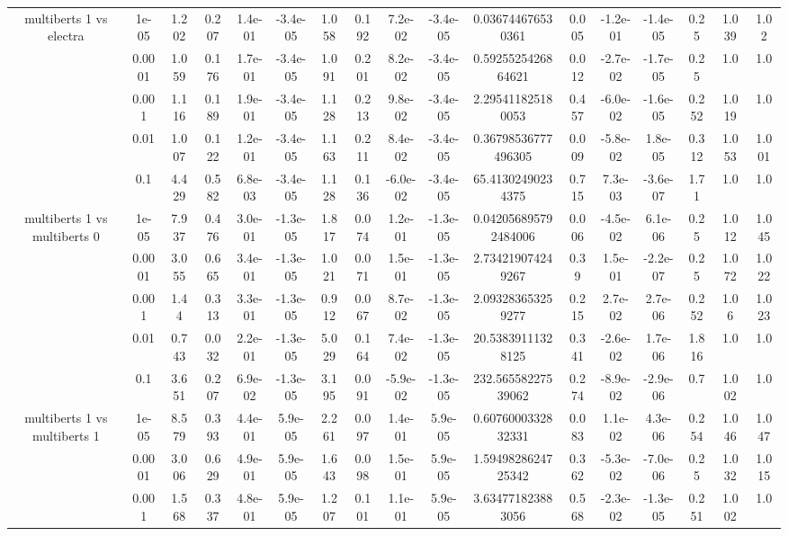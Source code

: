 \begin{tabular}{|c|c|c|c|c|c|c|c|c|c|c|c|c|c|c|c|c|}
\hline
\multirow{5}{*}{multiberts 1 vs electra } & 1e-05 & 1.202 & 0.207 & 1.4e-01 & -3.4e-05 & 1.058 & 0.192 & 7.2e-02 & -3.4e-05 & 0.036744676530361 & 0.005 & -1.2e-01 & -1.4e-05 & 0.25 & 1.039 & 1.02 \\
 & 0.0001 & 1.059 & 0.176 & 1.7e-01 & -3.4e-05 & 1.091 & 0.201 & 8.2e-02 & -3.4e-05 & 0.5925525426864621 & 0.012 & -2.7e-02 & -1.7e-05 & 0.25 & 1.0 & 1.0 \\
 & 0.001 & 1.116 & 0.189 & 1.9e-01 & -3.4e-05 & 1.128 & 0.213 & 9.8e-02 & -3.4e-05 & 2.295411825180053 & 0.457 & -6.0e-02 & -1.6e-05 & 0.252 & 1.019 & 1.0 \\
 & 0.01 & 1.007 & 0.122 & 1.2e-01 & -3.4e-05 & 1.163 & 0.211 & 8.4e-02 & -3.4e-05 & 0.36798536777496305 & 0.009 & -5.8e-02 & 1.8e-05 & 0.312 & 1.053 & 1.001 \\
 & 0.1 & 4.429 & 0.582 & 6.8e-03 & -3.4e-05 & 1.128 & 0.136 & -6.0e-02 & -3.4e-05 & 65.41302490234375 & 0.715 & 7.3e-03 & -3.6e-07 & 1.71 & 1.0 & 1.0 \\
\hline
\multirow{5}{*}{multiberts 1 vs multiberts 0} & 1e-05 & 7.937 & 0.476 & 3.0e-01 & -1.3e-05 & 1.817 & 0.074 & 1.2e-01 & -1.3e-05 & 0.042056895792484006 & 0.006 & -4.5e-02 & 6.1e-06 & 0.25 & 1.012 & 1.045 \\
 & 0.0001 & 3.055 & 0.665 & 3.4e-01 & -1.3e-05 & 1.021 & 0.071 & 1.5e-01 & -1.3e-05 & 2.734219074249267 & 0.39 & 1.5e-01 & -2.2e-07 & 0.25 & 1.072 & 1.022 \\
 & 0.001 & 1.44 & 0.313 & 3.3e-01 & -1.3e-05 & 0.912 & 0.067 & 8.7e-02 & -1.3e-05 & 2.093283653259277 & 0.215 & 2.7e-02 & 2.7e-06 & 0.252 & 1.06 & 1.023 \\
 & 0.01 & 0.743 & 0.032 & 2.2e-01 & -1.3e-05 & 5.029 & 0.164 & 7.4e-02 & -1.3e-05 & 20.53839111328125 & 0.341 & -2.6e-02 & 1.7e-06 & 1.816 & 1.0 & 1.0 \\
 & 0.1 & 3.651 & 0.207 & 6.9e-02 & -1.3e-05 & 3.195 & 0.091 & -5.9e-02 & -1.3e-05 & 232.56558227539062 & 0.274 & -8.9e-02 & -2.9e-06 & 0.7 & 1.002 & 1.0 \\
\hline
\multirow{5}{*}{multiberts 1 vs multiberts 1} & 1e-05 & 8.579 & 0.393 & 4.4e-01 & 5.9e-05 & 2.261 & 0.097 & 1.4e-01 & 5.9e-05 & 0.6076000332832331 & 0.083 & 1.1e-02 & 4.3e-06 & 0.254 & 1.046 & 1.047 \\
 & 0.0001 & 3.006 & 0.629 & 4.9e-01 & 5.9e-05 & 1.643 & 0.098 & 1.5e-01 & 5.9e-05 & 1.5949828624725342 & 0.362 & -5.3e-02 & -7.0e-06 & 0.25 & 1.032 & 1.015 \\
 & 0.001 & 1.568 & 0.337 & 4.8e-01 & 5.9e-05 & 1.207 & 0.101 & 1.1e-01 & 5.9e-05 & 3.634771823883056 & 0.568 & -2.3e-02 & -1.3e-05 & 0.251 & 1.002 & 1.0 \\

\end{tabular}
